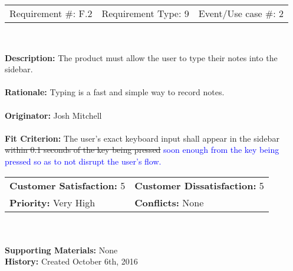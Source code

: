 \documentclass[12pt, titlepage]{article}
\begin{document}
\begin{framed}
	
	\begin{center}
		
		\begin{tabular}{ l c r }
			Requirement \#: F.2 & Requirement Type: 9 & Event/Use case \#: 2\\
		\end{tabular} \\
	\end{center}
	\textbf{Description:} The product must allow the user to type their notes 
	into the sidebar.\\
	\\
	\textbf{Rationale:} Typing is a fast and simple way to record notes. \\
	\\
	\textbf{Originator:} Josh Mitchell \\
	\\
	\textbf{Fit Criterion:} The user's exact keyboard input shall appear in the 
	sidebar \sout{within 0.1 seconds of the key being pressed} 
	\textcolor{blue}{ soon enough from the key being pressed so as to not 
	disrupt the user's flow.} \\
	
	\begin{tabular}{ll}
		\textbf{Customer Satisfaction:} 5 & \textbf{Customer Dissatisfaction:} 
		5 \\
		\textbf{Priority:} Very High & \textbf{Conflicts:} None\\
	\end{tabular} \\
	\\
	\textbf{Supporting Materials:} None \\
	\textbf{History:} Created October 6th, 2016
	
\end{framed}
\end{document}
